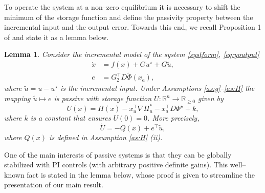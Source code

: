 \documentclass[10pt, conference]{ieeeconf}
\newtheorem{lemma}{Lemma}
\def\begequ{\begin{equation}}
\def\endequ{\end{equation}}
\def\lab{\label}
\begin{document}
To operate the system at a non--zero equilibrium it is necessary to shift the minimum of the storage function and define the passivity property between the incremental input and the output error. Towards this end, we
recall Proposition 1 of \cite{JAYetal} and state it as a lemma below.
\begin{lemma} 
\lab{lem1}
Consider the incremental model of the system \eqref{systform}, \eqref{eq:youtput}
\begin{equation} \label{eq:IncrModel}
	\begin{aligned}
		\dot x &= f(x) + G u^{\star} + G \tilde{u},  \\
		e &= G_2^\top D \tilde {\Phi}(x_a),
	\end{aligned}
\end{equation}
where $\tilde{u} = u - u^{\star}$ is the incremental input. Under Assumptions \ref{as:g}--\ref{as:H} the mapping $\tilde u \mapsto e$  is passive with storage function $U: \mathbb{R}^n\to \mathbb{R}_{\geq 0}$ given by
\begin{equation}
\lab{h0}
			U(x)=H(x)-x_u^\top \nabla H_u^*- x_a^\top D\Phi^\star+k,
\end{equation}
where $k$ is a constant that ensures $U(0)=0$. More precisely,
\begequ
\lab{doth0}
\dot{U} = -Q(x) + e^\top \tilde{u},
\endequ
where $Q(x)$ is defined in Assumption \ref{as:H} (ii).
\end{lemma}

One of the main interests of passive systems is that they can be globally stabilized with PI controls (with arbitrary positive definite gains). This well--known fact is stated in the lemma below, whose proof is given to streamline the presentation of our main result.
\end{document}
